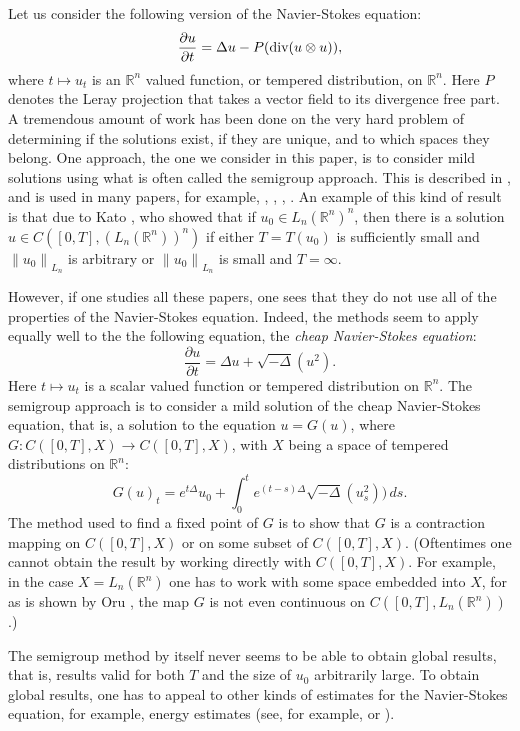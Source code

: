 \documentclass[12pt]{article}
\newcommand{\R}{{\mathbb R}}
\newcommand{\snormo}[1]{{\mathopen\|#1\mathclose\|}}
\renewcommand{\div}{\text{\rm div}}
\begin{document}
Let us consider the following version of the Navier-Stokes equation:
\[
\frac{\partial u}{\partial t} = \Delta u - P(\div(u \otimes u)),
\]
where $t \mapsto u_t$ is an $\R^n$ valued function,
or tempered distribution, on $\R^n$.  
Here $P$ denotes the Leray projection that takes
a vector field to its divergence free part.
A tremendous amount of work has been done on
the very hard problem of determining if the solutions exist, if they
are unique, and to which spaces they belong.
One approach, the one we consider in this paper, 
is to consider mild solutions using what is often
called the semigroup approach.  
This is described in \cite{Ca1}, and
is used in many papers, for example, \cite{FK}, \cite{K}, \cite{GM}, \cite{KT}.
An example of this kind of result is that due to Kato \cite{K},
who showed that if $u_0 \in L_n(\R^n)^n$, 
then there is a solution $u \in C([0,T],(L_n(\R^n))^n)$
if either $T=T(u_0)$ is sufficiently 
small and $\snormo{u_0}_{L_n}$ is arbitrary or 
$\snormo{u_0}_{L_n}$ is small and $T=\infty$.
 
However, if one studies all these papers, one sees that they 
do not use all of the properties of the Navier-Stokes equation.  
Indeed, the methods seem to apply equally well to the the following
equation, the {\em cheap Navier-Stokes equation}:
\begin{equation*}
\frac{\partial u}{\partial t} = \Delta u + \sqrt{-\Delta} (u^2) .
\end{equation*}
Here $t\mapsto u_t$ is a scalar valued function or tempered distribution
on $\R^n$.
The semigroup approach is to consider
a mild solution of the cheap Navier-Stokes equation, that is, 
a solution to the equation 
$u = G(u)$,
where $G:C([0,T],X) \to C([0,T],X)$, 
with $X$ being a space of tempered distributions on $\R^n$:
\begin{equation*}
G(u)_t = 
e^{t \Delta} u_0 + \int_0^t e^{(t-s)\Delta} \sqrt{-\Delta}(u_s^2)) \, ds .
\end{equation*}
The method used 
to find a fixed point of $G$ is to show that $G$ is a contraction
mapping on $C([0,T],X)$ or on some subset of $C([0,T],X)$.
(Oftentimes one cannot obtain the result by working directly
with $C([0,T],X)$.  For example, in the case $X = L_n(\R^n)$ one
has to work with some space embedded into $X$, for as is shown by
Oru \cite{O}, the map $G$ is not even continuous on $C([0,T],L_n(\R^n))$.)

The semigroup
method by itself never seems to be able to obtain global results, that is,
results valid for both $T$ and the size of $u_0$ arbitrarily large.  
To obtain global results, one has to appeal to other
kinds of estimates for the Navier-Stokes equation, for example, energy
estimates (see, for example, \cite{KF} or \cite{Ca2}).
\end{document}
